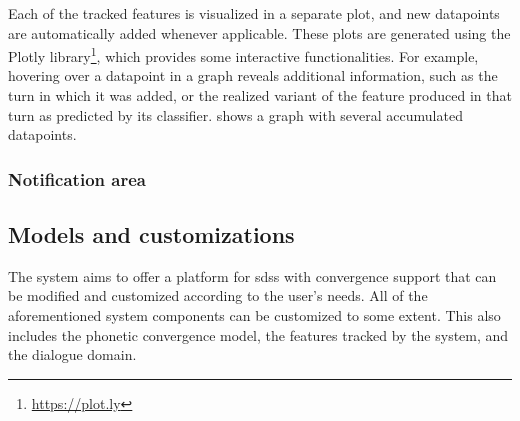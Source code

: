 Each of the tracked features is visualized in a separate plot, and new datapoints are automatically added whenever applicable.
These plots are generated using the Plotly library\footnote{\url{https://plot.ly}}, which provides some interactive functionalities.
For example, hovering over a datapoint in a graph reveals additional information, such as the turn in which it was added, or the realized variant of the feature produced in that turn as predicted by its classifier.
 shows a graph with several accumulated datapoints.

\subsubsection{Notification area}
\label{subsubsec:notification_area}

%

\subsection{Models and customizations}
\label{subsec:models_and_cusomizations}

The system aims to offer a platform for \acp{sds} with convergence support that can be modified and customized according to the user's needs.
All of the aforementioned system components can be customized to some extent.
This also includes the phonetic convergence model, the features tracked by the system, and the dialogue domain.

